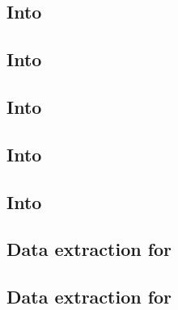 \subsection{Into \wcpMod{}                        \lispTodo{}}        \label{rlp auth: lookup: into wcp}                   
\subsection{Into \rlpUtilsMod{}                   \lispTodo{}}        \label{rlp auth: lookup: into rlp utils}             
\subsection{Into \userTxnDataMod{}                \lispTodo{}}        \label{rlp auth: lookup: into txn data}              
\subsection{Into \btcMod{}                        \lispTodo{}}        \label{rlp auth: lookup: into block data}            
\subsection{Into \hubMod{}                        \lispTodo{}}        \label{rlp auth: lookup: into hub}                   
\subsection{Data extraction for \macroEcrecover{} \lispTodo{}}        \label{rlp auth: lookup: extraction for ecrecover}   
\subsection{Data extraction for      \lispTodo{}}        \label{rlp auth: lookup: extraction for keccak}      
